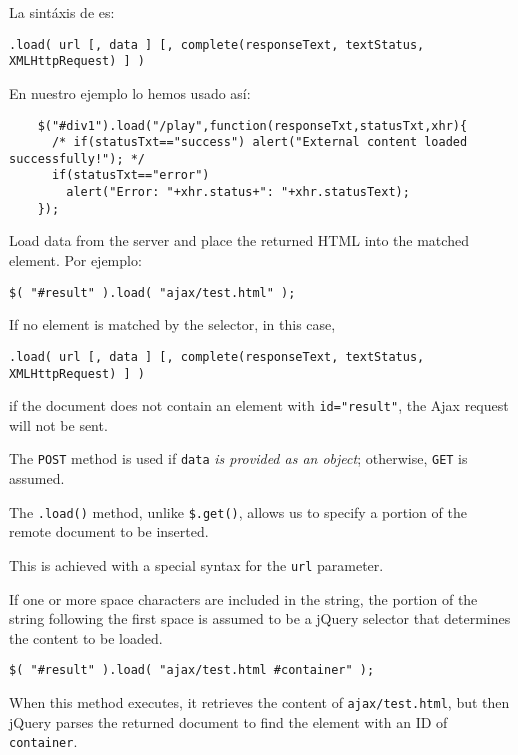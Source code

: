 La sintáxis de 
es:
\begin{verbatim}
.load( url [, data ] [, complete(responseText, textStatus, XMLHttpRequest) ] )
\end{verbatim}

En nuestro ejemplo lo hemos usado así:

\begin{verbatim}
    $("#div1").load("/play",function(responseTxt,statusTxt,xhr){
      /* if(statusTxt=="success") alert("External content loaded successfully!"); */
      if(statusTxt=="error")
        alert("Error: "+xhr.status+": "+xhr.statusText);
    });
\end{verbatim}
Load data from the server and place the returned HTML into the matched element.
Por ejemplo:
\begin{verbatim}
$( "#result" ).load( "ajax/test.html" );
\end{verbatim}
If no element is matched by the selector, in this case, 
\begin{verbatim}
.load( url [, data ] [, complete(responseText, textStatus, XMLHttpRequest) ] )
\end{verbatim}
if the document does not contain an element with \verb|id="result"|,
the Ajax request will not be sent.

The \verb|POST| method is used if \verb|data| \emph{is provided as an
object}; otherwise, \verb|GET| is assumed.

The \verb|.load()| method, unlike \verb|$.get()|, 
allows us to specify a portion of the remote document to be inserted. 

This is achieved with a special syntax for the \verb|url| 
parameter. 

If one or more space characters are included in the string, 
the portion of the string following the first space is assumed 
to be a jQuery selector that determines the content to be loaded.

\begin{verbatim}
$( "#result" ).load( "ajax/test.html #container" );
\end{verbatim}

When this method executes, it retrieves the content of \verb|ajax/test.html|,
but then jQuery parses the returned document to find the element
with an ID of \verb|container|. 

